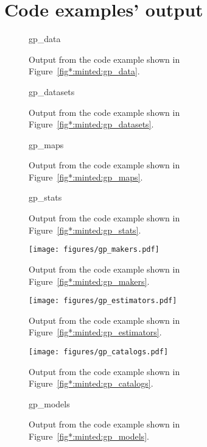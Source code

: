 \documentclass[longauth]{aa}
\begin{document}



\appendix
\section{Code examples' output}

\begin{figure}[!ht]
        \small
    	{gp_data}
        \caption{Output from the code example shown in Figure~\ref{fig*:minted:gp_data}.}
        \label{fig:code_example_gp_data}
\end{figure}


\begin{figure}[!ht]
        \small
        {gp_datasets}
        \caption{Output from the code example shown in Figure~\ref{fig*:minted:gp_datasets}.}
        \label{fig:code_example_gp_datasets}
\end{figure}

\begin{figure}[!ht]
        \small
        {gp_maps}
        \caption{Output from the code example shown in Figure~\ref{fig*:minted:gp_maps}.}
        \label{fig:code_example_gp_maps}
\end{figure}


\begin{figure}[!ht]
        \small
        {gp_stats}
        \caption{Output from the code example shown in Figure~\ref{fig*:minted:gp_stats}.}
        \label{fig:code_example_gp_stats}
\end{figure}


\begin{figure*}[!ht]
        \centering
        \texttt{[image: figures/gp\_makers.pdf]}
        \caption{Output from the code example shown in Figure~\ref{fig*:minted:gp_makers}.}
        \label{fig:code_example_gp_makers}
\end{figure*}


\begin{figure*}[!ht]
        \centering
        \texttt{[image: figures/gp\_estimators.pdf]}
        \caption{Output from the code example shown in Figure~\ref{fig*:minted:gp_estimators}.}
        \label{fig:code_example_gp_estimators}
\end{figure*}


\begin{figure*}[!ht]
        \centering
        \texttt{[image: figures/gp\_catalogs.pdf]}
        \caption{Output from the code example shown in Figure~\ref{fig*:minted:gp_catalogs}.}
        \label{fig:code_example_gp_catalogs}
\end{figure*}

\begin{figure}[!ht]
        \small
        {gp_models}
        \caption{Output from the code example shown in Figure~\ref{fig*:minted:gp_models}.}
        \label{fig:code_example_gp_models}
\end{figure}
\end{document}
